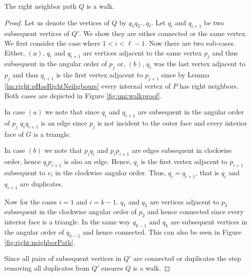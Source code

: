     \begin{lemma}
      \label{lm:right:neighborWalk}
      The right neighbor path $Q$ is a walk.
    \end{lemma}
    \begin{proof}
      Let us denote the vertices of $Q$ by $q_1 q_2 \ldots q_\ell$.
      Let $q_i$ and $q_{i+1}$ be two subsequent vertices of $Q'$. We show they are either connected or the same vertex. We first consider the case where $1 < i < \ell-1$.
      Now there are two sub-cases. Either, $(a)$, $q_i$ and $ q_{i+1}$ are vertices adjacent to the same vertex $p_j$ and thus subsequent in the angular order of $p_j$ or, $(b)$, $q_i$ was the last vertex adjacent to $p_j$ and thus $q_{i+1}$ is the first vertex adjacent to $p_{j+1}$ since by Lemma \ref{lm:right:pHasRightNeihgbours} every internal vertex of $P$ has right neighbors.
      Both cases are depicted in Figure \ref{fig:uni:walkproof}.

      In case $(a)$ we note that since $q_i$ and $q_{i+1}$ are subsequent in the angular order of $p_j$ $q_i q_{i+1}$ is an edge since $p_j$ is not incident to the outer face and every interior face of $G$ is a triangle.

      In case $(b)$ we note that $p_i q_i$ and $p_i p_{i+1}$ are edges subsequent in clockwise order, hence $q_{i} p_{i+1}$ is also an edge. Hence, $q_i$ is the first vertex adjacent to $p_{i+1}$ subsequent to $v_i$ in the clockwise angular order. Thus, $q_{i} = q_{i+1}$, that is $q_i$ and $q_{i+1}$ are duplicates.

      Now for the cases $i=1$ and $i=k-1$. $q_1$ and $q_2$ are vertices adjacent to $p_{2}$ subsequent in the clockwise angular order of ${p_2}$ and hence connected since every interior face is a triangle. In the same way $q_{k-1}$ and $q_k$ are subsequent vertices in the angular order of $q_{k-1}$ and hence connected. This can also be seen in Figure \ref{fig:right:neighborPath}.

      Since all pairs of subsequent vertices in $Q'$ are connected or duplicates the step removing all duplicates from $Q'$ ensures $Q$ is a walk.


\end{proof}
